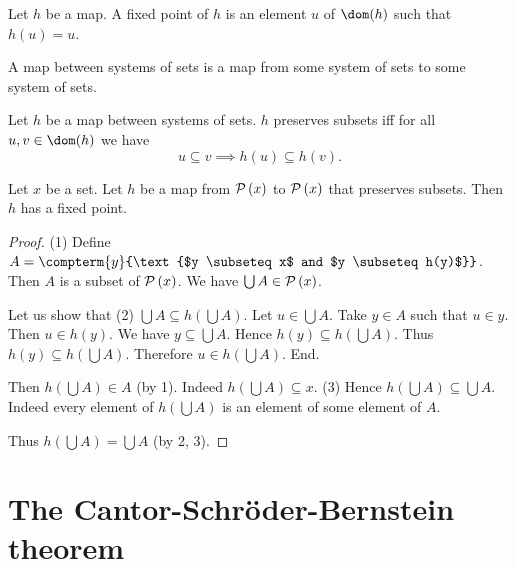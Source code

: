\documentclass{article}
\begin{document}
  \begin{forthel}
    \begin{definition*}
      Let $h$ be a map.
      A fixed point of $h$ is an element $u$ of $\dom(h)$ such that $h(u) = u$.
    \end{definition*}

    \begin{definition*}
      A map between systems of sets is a map from some system of sets to some
      system of sets.
    \end{definition*}

    \begin{definition*}
      Let $h$ be a map between systems of sets.
      $h$ preserves subsets iff for all $u, v \in \dom(h)$
      we have \[ u \subseteq v \implies h(u) \subseteq h(v). \]
    \end{definition*}

    \begin{theorem*}\label{KT}
      Let $x$ be a set.
      Let $h$ be a map from $\mathcal{P}\left(x\right)$ to $\mathcal{P}\left(x\right)$ that preserves subsets.
      Then $h$ has a fixed point.
    \end{theorem*}
    \begin{proof}
      (1) Define $A = \compterm{y}{\text{$y \subseteq x$ and $y \subseteq h(y)$}}$.
      Then $A$ is a subset of $\mathcal{P}\left(x\right)$.
      We have $\bigcup A \in \mathcal{P}\left(x\right)$.

      Let us show that (2) $\bigcup A \subseteq h(\bigcup A)$.
        Let $u \in \bigcup A$.
        Take $y \in A$ such that $u \in y$.
        Then $u \in h(y)$.
        We have $y \subseteq \bigcup A$.
        Hence $h(y) \subseteq h(\bigcup A)$.
        Thus $h(y) \subseteq h(\bigcup A)$.
        Therefore $u \in h(\bigcup A)$.
      End.

      Then $h(\bigcup A) \in A$ (by 1).
      Indeed $h(\bigcup A) \subseteq x$.
      (3) Hence $h(\bigcup A) \subseteq \bigcup A$.
      Indeed every element of $h(\bigcup A)$ is an element of some element of
      $A$.

      Thus $h(\bigcup A) = \bigcup A$ (by 2, 3).
    \end{proof}
  \end{forthel}


  \section*{The Cantor-Schröder-Bernstein theorem}
\end{document}
